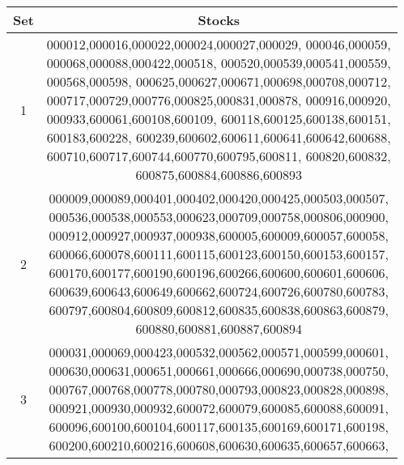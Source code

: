\documentclass[sigconf]{acmart}
\begin{document}
\begin{table}[htp]
	\centering
	\small
	\begin{tabular}{@{} c @{} || c  @{}}
		\toprule
		Set & Stocks \\\midrule\midrule
		1 & \makecell[l]{000012,000016,000022,000024,000027,000029,
        000046,000059,\\000068,000088,000422,000518,
        000520,000539,000541,000559,\\000568,000598,
        000625,000627,000671,000698,000708,000712,\\
        000717,000729,000776,000825,000831,000878,
        000916,000920,\\000933,600061,600108,600109,
        600118,600125,600138,600151,\\600183,600228,
        600239,600602,600611,600641,600642,600688,\\
        600710,600717,600744,600770,600795,600811,
        600820,600832,\\600875,600884,600886,600893} \\ \midrule
		2 & \makecell[l]{000009,000089,000401,000402,000420,000425,000503,000507,\\
        000536,000538,000553,000623,000709,000758,000806,000900,\\
        000912,000927,000937,000938,600005,600009,600057,600058,\\
        600066,600078,600111,600115,600123,600150,600153,600157,\\
        600170,600177,600190,600196,600266,600600,600601,600606,\\
        600639,600643,600649,600662,600724,600726,600780,600783,\\
        600797,600804,600809,600812,600835,600838,600863,600879,\\600880,600881,600887,600894} \\ \midrule
		3 & \makecell[l]{000031,000069,000423,000532,000562,000571,000599,000601,\\
        000630,000631,000651,000661,000666,000690,000738,000750,\\
        000767,000768,000778,000780,000793,000823,000828,000898,\\
        000921,000930,000932,600072,600079,600085,600088,600091,\\
        600096,600100,600104,600117,600135,600169,600171,600198,\\
        600200,600210,600216,600608,600630,600635,600657,600663,\\
}
\end{tabular}
\end{table}
\end{document}
